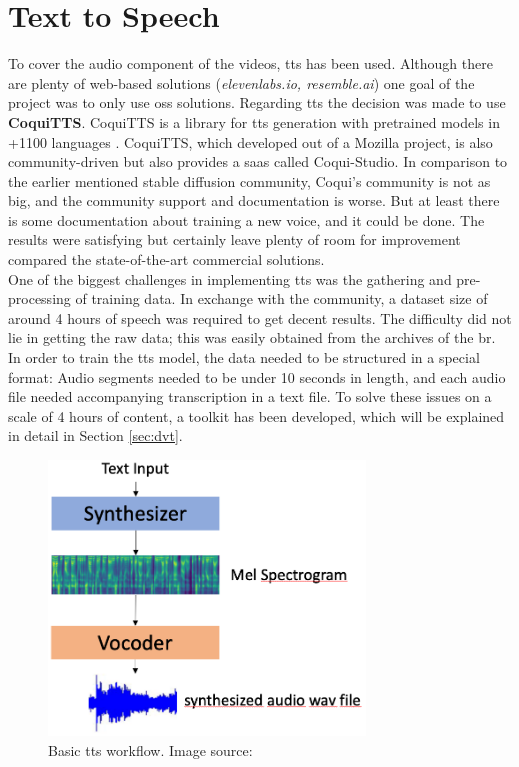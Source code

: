 \documentclass[
  a4paper,  %
  twoside,  %
  bibliography=totoc,
  headsepline,
  cleardoublepage=empty,
  parskip=half,
  draft=false
]{scrbook}
\begin{document}
\section{Text to Speech}
\label{sec:tts}
To cover the audio component of the videos, \gls{tts} has been used. Although there are plenty of web-based solutions (\textit{elevenlabs.io, resemble.ai}) one goal of the project was to only use \gls{oss} solutions. Regarding \gls*{tts} the decision was made to use \textbf{CoquiTTS}. CoquiTTS is a library for \gls{tts} generation with pretrained models in +1100 languages \cite{erenCoquiTTS2021}. CoquiTTS, which developed out of a Mozilla project, is also community-driven but also provides a \gls{saas} called Coqui-Studio. In comparison to the earlier mentioned stable diffusion community, Coqui's community is not as big, and the community support and documentation is worse. But at least there is some documentation about training a new voice, and it could be done. The results were satisfying but certainly leave plenty of room for improvement compared the state-of-the-art commercial solutions. \\
One of the biggest challenges in implementing \gls{tts} was the gathering and pre-processing of training data. In exchange with the community, a dataset size of around 4 hours of speech was required to get decent results. The difficulty did not lie in getting the raw data; this was easily obtained from the archives of the \gls{br}. In order to train the \gls{tts} model, the data needed to be structured in a special format: Audio segments needed to be under 10 seconds in length, and each audio file needed accompanying transcription in a text file. To solve these issues on a scale of 4 hours of content, a toolkit has been developed, which will be explained in detail in Section \ref{sec:dvt}.
\begin{figure}[h]
  \centering
  \includegraphics[width=0.75\textwidth]{./graphics/images/tts/tts-workflow.png}
  \caption{Basic \gls{tts} workflow. Image source: \cite{jemineRealTimeVoiceCloning2019}}
  \label{fig:tts-explainer}
\end{figure}
\end{document}
